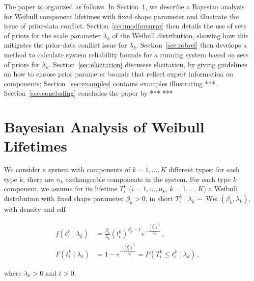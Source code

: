 \documentclass[Journal,SectionNumbers,SingleSpace,InsideFigs]{ascelike}
\newcommand{\Rsys}{R_\text{sys}}
\def\Rsys{R_\text{sys}}
\newcommand{\wei}{\operatorname{Wei}} %
\def\tnow{t_\text{now}}
\begin{document}
  
The paper is organized as follows.
In Section~\ref{sec:weibull}, we describe a Bayesian analysis for Weibull component lifetimes
with fixed shape parameter
and illustrate the issue of prior-data conflict.
Section~\ref{sec:modforsurpr} then details the use of sets of priors
for the scale parameter $\lambda_k$ of the Weibull distribution,
showing how this mitigates the prior-data conflict issue for $\lambda_k$.
Section~\ref{sec:robrel} then develops a method to calculate system reliability bounds
for a running system based on sets of priors for $\lambda_k$. 
Section~\ref{sec:elicitation} discusses elicitation,
by giving guidelines on how to choose prior parameter bounds
that reflect expert information on components;
Section~\ref{sec:examples} contains examples illustrating ***.
Section~\ref{sec:concluding} concludes the paper by *** 
***



\section{Bayesian Analysis of Weibull Lifetimes}
\label{sec:weibull}

We consider a system with components of $k=1,\ldots,K$ different types;
for each type $k$, there are $n_k$ exchangeable components in the system.
For each type $k$ component, we assume for its lifetime $T_i^k$ ($i=1,\ldots,n_k$, $k = 1, \ldots, K$)
a Weibull distribution with fixed shape parameter $\beta_k > 0$,
in short $T_i^k \mid \lambda_k \sim \wei(\beta_k,\lambda_k)$,
with density and cdf%
\begin{linenomath*}
\begin{align}
\label{eq:weibulldens}
f(t_i^k \mid \lambda_k) &= \frac{\beta_k}{\lambda_k} (t_i^k)^{\beta_k-1} e^{-\frac{(t_i^k)^{\beta_k}}{\lambda_k}}\,, \\
\label{eq:weibullcdf}
F(t_i^k \mid \lambda_k) &= 1 - e^{-\frac{(t_i^k)^{\beta_k}}{\lambda_k}} = P(T_i^k \leq t_i^k \mid \lambda_k)\,,
\end{align}
\end{linenomath*}
where $\lambda_k > 0$ and $t > 0$.
\end{document}
